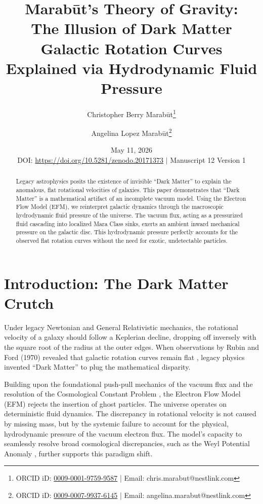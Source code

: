 \documentclass[11pt, a4paper, table]{article}
\title{\textbf{Marab\={u}t's Theory of Gravity: \\ The Illusion of Dark Matter} \\[1em] \large{Galactic Rotation Curves Explained via Hydrodynamic Fluid Pressure}}
\author[1]{Christopher Berry Marab\={u}t\thanks{ORCID iD: \href{https://orcid.org/0009-0001-9759-9587}{0009-0001-9759-9587} | Email: chris.marabut@nestlink.com}}
\author[1]{Angelina Lopez Marab\={u}t\thanks{ORCID iD: \href{https://orcid.org/0009-0007-9937-6145}{0009-0007-9937-6145} | Email: angelina.marabut@nestlink.com}}
\affil[1]{Independent Researchers}
\date{May 11, 2026 \\[1.5em] \small{DOI: \url{https://doi.org/10.5281/zenodo.20171373} $|$ Manuscript 12 Version 1}}
\begin{document}

\maketitle

\begin{abstract}
  Legacy astrophysics posits the existence of invisible ``Dark Matter'' to explain the anomalous, flat rotational velocities of galaxies. This paper demonstrates that ``Dark Matter'' is a mathematical artifact of an incomplete vacuum model. Using the Electron Flow Model (EFM), we reinterpret galactic dynamics through the macroscopic hydrodynamic fluid pressure of the universe. The vacuum flux, acting as a pressurized fluid cascading into localized Mara Class sinks, exerts an ambient inward mechanical pressure on the galactic disc. This hydrodynamic pressure perfectly accounts for the observed flat rotation curves without the need for exotic, undetectable particles.
\end{abstract}

\section{Introduction: The Dark Matter Crutch}
  Under legacy Newtonian and General Relativistic mechanics, the rotational velocity of a galaxy should follow a Keplerian decline, dropping off inversely with the square root of the radius at the outer edges. When observations by Rubin and Ford (1970) revealed that galactic rotation curves remain flat \cite{rubin1970}, legacy physics invented ``Dark Matter'' to plug the mathematical disparity. 

  Building upon the foundational push-pull mechanics of the vacuum flux \cite{marabut2026m1} and the resolution of the Cosmological Constant Problem \cite{marabut2026m11}, the Electron Flow Model (EFM) rejects the insertion of ghost particles. The universe operates on deterministic fluid dynamics. The discrepancy in rotational velocity is not caused by missing mass, but by the systemic failure to account for the physical, hydrodynamic pressure of the vacuum electron flux. The model's capacity to seamlessly resolve broad cosmological discrepancies, such as the Weyl Potential Anomaly \cite{marabut2026m2}, further supports this paradigm shift.
\end{document}
